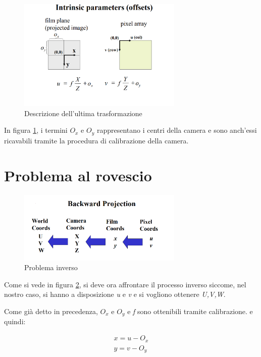 \begin{figure}[H]
	\centering
	\includegraphics[width=0.7\textwidth]{Immagini/intrinsic_parameters.png}
	\caption{Descrizione dell'ultima trasformazione}
	\label{fig:intrinsic_parameters}
\end{figure}
In figura \ref{fig:intrinsic_parameters}, i termini $ O_{x}$ e $ O_{y} $ rappresentano i centri della camera e sono anch'essi ricavabili tramite la procedura di calibrazione della camera.

\section{Problema al rovescio}
\begin{figure}[H]
	\centering
	\includegraphics[width=0.7\textwidth]{Immagini/backward.png}
	\caption{Problema inverso}
	\label{fig:backward}
\end{figure}

Come si vede in figura \ref{fig:backward}, si deve ora affrontare il processo inverso siccome, nel nostro caso, si hanno a disposizione \textit{u} e \textit{v} e si vogliono ottenere \textit{U,V,W}.

Come già detto in precedenza, $ O_{x}$ e $ O_{y} $ e \textit{f} sono ottenibili tramite calibrazione. e quindi:

\begin{equation}
\begin{split}
x = u -O_{x}\\
y = v -O_{y}
\end{split}
\end{equation}

